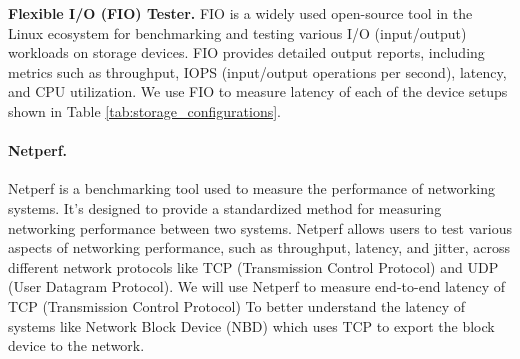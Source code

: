 \par\textbf{Flexible I/O (FIO) Tester.}
FIO is a widely used open-source tool in the Linux ecosystem for benchmarking
and testing various I/O (input/output) workloads on storage devices. FIO
provides detailed output reports, including metrics such as throughput, IOPS
(input/output operations per second), latency, and CPU utilization. We use FIO
to measure latency of each of the device setups shown in Table
\ref{tab:storage_configurations}. 

\begin{table}[h!]
\centering
{}
\caption{Storage device setups.}
\label{tab:storage_configurations}
\end{table}

\paragraph{Netperf.} 
Netperf is a benchmarking tool used to measure the performance of networking
systems. It's designed to provide a standardized method for measuring networking
performance between two systems. Netperf allows users to test various aspects of
networking performance, such as throughput, latency, and jitter, across
different network protocols like TCP (Transmission Control Protocol) and UDP
(User Datagram Protocol). We will use Netperf to measure end-to-end latency of
TCP (Transmission Control Protocol) To better understand the latency of systems
like Network Block Device (NBD) which uses TCP to export the block device to the
network.

